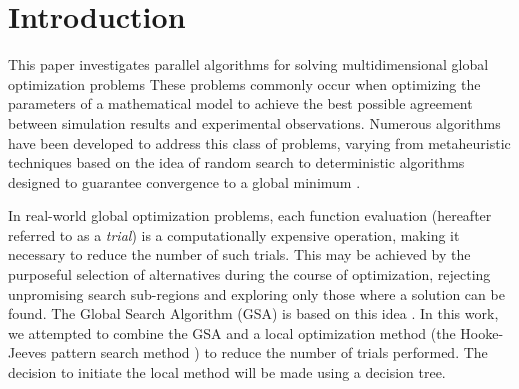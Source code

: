 \documentclass[runningheads]{llncs}
\begin{document}
\section{Introduction}

This paper investigates parallel algorithms for solving multidimensional global optimization problems These problems commonly occur when optimizing the parameters of a mathematical model to achieve the best possible agreement between simulation results and experimental observations. Numerous algorithms have been developed to address this class of problems, varying from metaheuristic techniques based on the idea of random search \cite{Ferreiro2013,Garcia2014,Langdon2011} to deterministic algorithms designed to guarantee convergence to a global minimum \cite{Evtushenko2009,He2008,Paulavicius2011}.


In real-world global optimization problems, each function evaluation (hereafter referred to as a \textit{trial}) is a computationally expensive operation, making it necessary to reduce the number of such trials. This may be achieved by the purposeful selection of alternatives during the course of optimization, rejecting unpromising search sub-regions and exploring only those where a solution can be found. The Global Search Algorithm (GSA) is based on this idea \cite{Strongin2000}. In this work, we attempted to combine the GSA and a local optimization method \cite{Nocedal, Kelley} (the Hooke-Jeeves pattern search method \cite{HookJeeves}) to reduce the number of trials performed. The decision to initiate the local method will be made using a decision tree.
\end{document}
